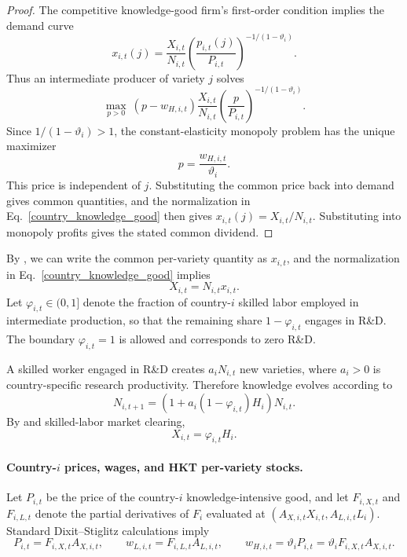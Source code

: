 \documentclass{article}
\def\green#1{#1}%
\begin{document}
\begin{proof}
The competitive knowledge-good firm's first-order condition implies the
demand curve
\[
x_{i,t}(j)
=
\frac{X_{i,t}}{N_{i,t}}
\left(\frac{p_{i,t}(j)}{P_{i,t}}\right)^{-1/(1-\vartheta_i)} .
\]
Thus an intermediate producer of variety $j$ solves
\[
\max_{p>0}
\ (p-w_{H,i,t})
\frac{X_{i,t}}{N_{i,t}}
\left(\frac{p}{P_{i,t}}\right)^{-1/(1-\vartheta_i)} .
\]
Since $1/(1-\vartheta_i)>1$, the constant-elasticity monopoly problem has
the unique maximizer
\[
p=\frac{w_{H,i,t}}{\vartheta_i}.
\]
This price is independent of $j$. Substituting the common price back into demand gives common quantities, and the normalization in Eq.~\eqref{country_knowledge_good} then gives $x_{i,t}(j)=X_{i,t}/N_{i,t}$. Substituting into monopoly profits gives the stated common dividend.
\end{proof}

By , we can write the common per-variety quantity as $x_{i,t}$, and the normalization in Eq.~\eqref{country_knowledge_good} implies
\[
X_{i,t}=N_{i,t}x_{i,t}.
\]
Let $\varphi_{i,t}\in(0,1]$ denote the fraction of country-$i$ skilled labor employed in intermediate production, so that the remaining share $1-\varphi_{i,t}$ engages in R\&D.  \green{The boundary} $\green{\varphi}_{\green{i},\green{t}}\green{=1}$ \green{is allowed and corresponds to zero R}\&\green{D}.

A skilled worker engaged in R\&D creates $a_iN_{i,t}$ new varieties, where $a_i>0$ is country-specific research productivity. Therefore knowledge evolves according to
\begin{equation}\label{country_knowledge_law}
N_{i,t+1}=(1+a_i(1-\varphi_{i,t})H_i)N_{i,t}.
\end{equation}
By  and skilled-labor market clearing,
\begin{equation}\label{country_X_phi}
X_{i,t}=\varphi_{i,t}H_i.
\end{equation}

\paragraph{Country-$i$ prices, wages, and HKT per-variety stocks.}
Let $P_{i,t}$ be the price of the country-$i$ knowledge-intensive good, and let $F_{i,X,t}$ and $F_{i,L,t}$ denote the partial derivatives of $F_i$ evaluated at $(A_{X,i,t}X_{i,t},A_{L,i,t}L_i)$. Standard Dixit--Stiglitz calculations imply
\begin{equation}\label{country_factor_prices}
P_{i,t}=F_{i,X,t}A_{X,i,t},
\qquad
w_{L,i,t}=F_{i,L,t}A_{L,i,t},
\qquad
w_{H,i,t}=\vartheta_i P_{i,t}=\vartheta_i F_{i,X,t}A_{X,i,t}.
\end{equation}
\end{document}
